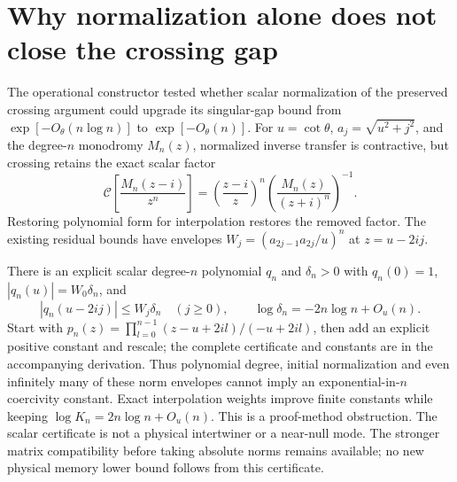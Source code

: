 \section{Why normalization alone does not close the crossing gap}
The operational constructor tested whether scalar normalization of the
preserved crossing argument could upgrade its singular-gap bound from
$\exp[-O_\theta(n\log n)]$ to $\exp[-O_\theta(n)]$.
For $u=\cot\theta$, $a_j=\sqrt{u^2+j^2}$, and the degree-$n$ monodromy
$M_n(z)$, normalized inverse transfer is contractive, but crossing retains
the exact scalar factor
\[
 \mathcal C\left[\frac{M_n(z-i)}{z^n}\right]
 =\left(\frac{z-i}{z}\right)^n
 \left(\frac{M_n(z)}{(z+i)^n}\right)^{-1}.
\]
Restoring polynomial form for interpolation restores the removed factor.
The existing residual bounds have envelopes
$W_j=(a_{2j-1}a_{2j}/u)^n$ at $z=u-2ij$.

There is an explicit scalar degree-$n$ polynomial $q_n$ and $\delta_n>0$
with $q_n(0)=1$, $|q_n(u)|=W_0\delta_n$, and
\[
 |q_n(u-2ij)|\le W_j\delta_n\quad(j\ge0),\qquad
 \log\delta_n=-2n\log n+O_u(n).
\]
Start with $p_n(z)=\prod_{l=0}^{n-1}(z-u+2il)/(-u+2il)$, then add an
explicit positive constant and rescale; the complete certificate and
constants are in the accompanying derivation. Thus polynomial degree,
initial normalization and even infinitely many of these norm envelopes
cannot imply an exponential-in-$n$ coercivity constant. Exact interpolation
weights improve finite constants while keeping $\log K_n=2n\log n+O_u(n)$.
This is a proof-method obstruction. The scalar certificate is not a physical
intertwiner or a near-null mode. The stronger matrix compatibility before
taking absolute norms remains available; no new physical memory lower
bound follows from this certificate.

